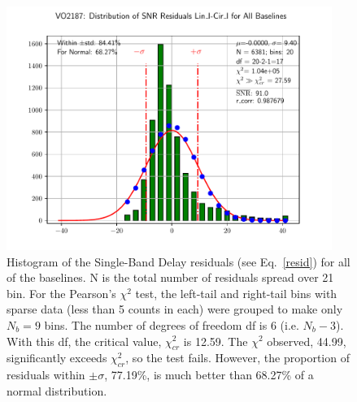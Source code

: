 \documentclass[letterpaper,twoside,12pt]{article}
\begin{document}
\begin{figure}[ht!]
  \begin{center}
  \includegraphics[width=25pc]{VO2187_Distr_SNR_Lin_I-Cir_I_Diff.pdf}
  \caption{\small Histogram of the Single-Band Delay residuals (see Eq.~\eqref{resid}) for all of the baselines. N is the total number of residuals spread over 21 bin. For the Pearson's $\chi^2$ test, the left-tail and right-tail bins with sparse data (less than 5 counts in each) were grouped to make only $N_b=9$ bins. The number of degrees of freedom df is 6 (i.e. $N_b-3$). With this df, the critical value, $\chi^2_{cr}$ is 12.59. The $\chi^2$ observed, 44.99, significantly exceeds $\chi^2_{cr}$, so the test fails. However, the proportion of residuals within $\pm\sigma$, 77.19\%, is much better than 68.27\% of a normal distribution.}
  \label{dsbd_distr}
  \end{center}
\end{figure}
\end{document}

